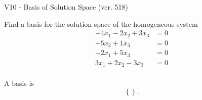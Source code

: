 \begin{exercise}
  \begin{exerciseTitle}V10 - Basis of Solution Space (ver. 518)\end{exerciseTitle}
  \begin{exerciseStatement}
    Find a basis for the solution space of the homogeneous system 
\begin{align*}
 -4 x_ 1 -2 x_ 2 + 3 x_ 3 &= 0  \\ 
  + 5 x_ 2 + 1 x_ 3 &= 0  \\ 
  -2 x_ 1 + 5 x_ 3 &= 0  \\ 
  3 x_ 1 + 2 x_ 2 -3 x_ 3 &= 0  \\ 
 \end{align*}


 
  \end{exerciseStatement}

  \begin{exerciseAnswer}
   A basis is   
\[\left\{\right\}.\]

  


  \end{exerciseAnswer}
\end{exercise}